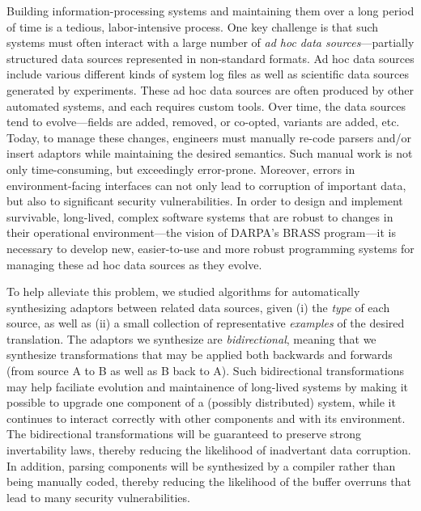 \documentclass[12pt]{article}
\begin{document}
Building information-processing systems and maintaining them over a long
period of time is a tedious, labor-intensive process.  One key challenge is
that such systems must often interact with a large number of
\emph{ad hoc data sources}---partially structured data sources represented
in non-standard formats.  Ad hoc data sources include various
different kinds of system log files as well as scientific data sources
generated by experiments.  These ad hoc data sources are often
produced by other automated systems, and each requires custom tools.
Over time, the data sources tend to evolve---fields are added,
removed, or co-opted, variants are added, etc.  Today, to manage these
changes, engineers must manually re-code parsers and/or insert
adaptors while maintaining the desired semantics.  Such manual work is
not only time-consuming, but exceedingly error-prone.  Moreover,
errors in environment-facing interfaces can not only lead to
corruption of important data, but also to significant security
vulnerabilities.  In order to design and implement survivable,
long-lived, complex software systems that are robust to changes 
in their operational environment---the vision of
DARPA's BRASS program---it is necessary to develop new, easier-to-use
and more robust programming systems for managing these ad hoc data
sources as they evolve.

To help alleviate this problem, we studied algorithms 
for automatically synthesizing adaptors between related data
sources, given (i) the \emph{type} of each
source, as well as (ii) a small collection of
representative \emph{examples} of the desired translation.  The
adaptors we synthesize are \emph{bidirectional}, meaning
that we synthesize transformations that may be applied both
backwards and forwards (from source A to B as well as B back to A).
Such bidirectional transformations may help faciliate evolution and
maintainence of long-lived systems by making it possible to upgrade
one component of a (possibly distributed) system, while it continues
to interact correctly with other components and with its environment.
The bidirectional transformations will be guaranteed to preserve
strong invertability laws, thereby reducing the likelihood of
inadvertant data corruption.  In addition, parsing components
will be synthesized by a compiler rather than being manually coded,
thereby reducing the likelihood of the buffer overruns that lead to
many security vulnerabilities.
\end{document}
